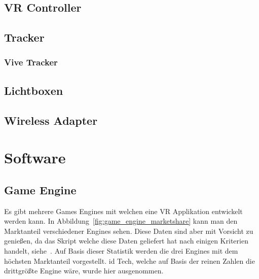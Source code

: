 \subsection{VR Controller}\label{sec:vr-controller}

\subsection{Tracker}\label{sec:tracker}

\subsubsection{Vive Tracker}\label{sec:vive-tracker}

\subsection{Lichtboxen}\label{sec:lighthouse}

\subsection{Wireless Adapter }

\section{Software}

\subsection{Game Engine}

Es gibt mehrere Games Engines mit welchen eine VR Applikation entwickelt werden kann.
In Abbildung~\ref{fig:game_engine_marketshare} kann man den Marktanteil verschiedener Engines sehen.
Diese Daten sind aber mit Vorsicht zu genießen, da das Skript welche diese Daten geliefert hat nach einigen Kriterien handelt, siehe~\cite{REDDIT_2018}.
Auf Basis dieser Statistik werden die drei Engines mit dem höchsten Marktanteil vorgestellt.
id Tech, welche auf Basis der reinen Zahlen die drittgrößte Engine wäre, wurde hier ausgenommen.

